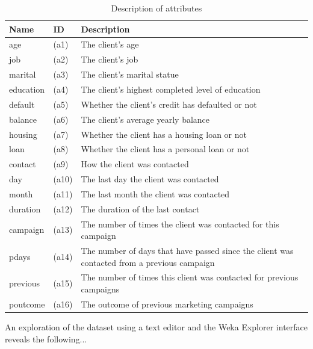 \documentclass[a4paper,11pt]{article}
\begin{document}
\begin{table}[H]
  \begin{center}
    \begin{tabular}{ | l | l | p{8.5cm} |}
      \hline
      Name & ID & Description \\ \hline
      age & (a1) & The client's age \\
      job & (a2) & The client's job \\
      marital & (a3) & The client's marital statue \\
      education & (a4) & The client's highest completed level of education \\
      default & (a5) & Whether the client's credit has defaulted or not \\
      balance & (a6) & The client's average yearly balance \\
      housing & (a7) & Whether the client has a housing loan or not \\
      loan & (a8) & Whether the client has a personal loan or not \\
      contact & (a9) & How the client was contacted \\
      day & (a10) & The last day the client was contacted \\
      month & (a11) & The last month the client was contacted \\
      duration & (a12) & The duration of the last contact \\
      campaign & (a13) & The number of times the client was contacted for this campaign \\
      pdays & (a14) & The number of days that have passed since the client was contacted from a previous campaign \\
      previous & (a15) & The number of times this client was contacted for previous campaigns \\
      poutcome & (a16) & The outcome of previous marketing campaigns \\
      \hline
    \end{tabular}
    \caption{Description of attributes}
    \label{tab:attributeTable}
  \end{center}
\end{table}
An exploration of the dataset using a text editor and the Weka Explorer interface
reveals the following...
\end{document}
